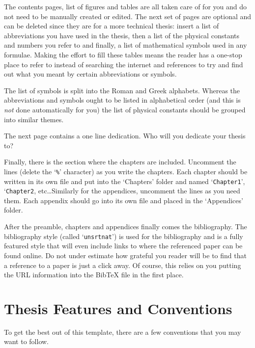 The contents pages, list of figures and tables are all taken care of for you and do not need to be manually created or edited. The next set of pages are optional and can be deleted since they are for a more technical thesis: insert a list of abbreviations you have used in the thesis, then a list of the physical constants and numbers you refer to and finally, a list of mathematical symbols used in any formulae. Making the effort to fill these tables means the reader has a one-stop place to refer to instead of searching the internet and references to try and find out what you meant by certain abbreviations or symbols.

The list of symbols is split into the Roman and Greek alphabets. Whereas the abbreviations and symbols ought to be listed in alphabetical order (and this is \emph{not} done automatically for you) the list of physical constants should be grouped into similar themes.

The next page contains a one line dedication. Who will you dedicate your thesis to?

Finally, there is the section where the chapters are included. Uncomment the lines (delete the `\texttt{\%}' character) as you write the chapters. Each chapter should be written in its own file and put into the `Chapters' folder and named `\texttt{Chapter1}', `\texttt{Chapter2}, etc\ldots Similarly for the appendices, uncomment the lines as you need them. Each appendix should go into its own file and placed in the `Appendices' folder.

After the preamble, chapters and appendices finally comes the bibliography. The bibliography style (called `\texttt{unsrtnat}') is used for the bibliography and is a fully featured style that will even include links to where the referenced paper can be found online. Do not under estimate how grateful you reader will be to find that a reference to a paper is just a click away. Of course, this relies on you putting the URL information into the BibTeX file in the first place.


\section{Thesis Features and Conventions}\label{ThesisConventions}

To get the best out of this template, there are a few conventions that you may want to follow.

